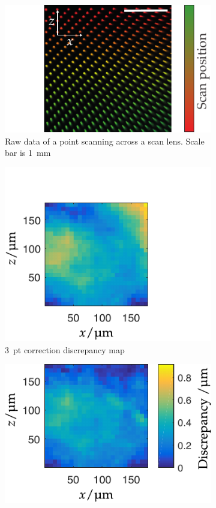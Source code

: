 \begin{figure}
	\centering
    \begin{subfigure}[t]{\textwidth}
        \centering
        \includegraphics{scan_lens/telecentric_colour/telecentric_induced_distortion_scale}
        \caption{Raw data of a point scanning across a scan lens. Scale bar is \SI{1}{\milli\meter}}\label{fig:scan_lens/telecentric_colour/telecentric_induced_distortion_scale}
    \end{subfigure}
    \hfill
    \begin{subfigure}[t]{0.4\textwidth}
        \centering
        \includegraphics{scan_lens/discrepancyHeatMap3pt_v2}
        \caption{3~pt correction discrepancy map}\label{fig:scan_lens/discrepancyHeatMap3pt_v2}
    \end{subfigure}\hspace{0.05\textwidth}
    \begin{subfigure}[t]{0.4\textwidth}
        \centering
        \includegraphics{scan_lens/discrepancyHeatMap4pt_v2}

\end{subfigure}
\end{figure}
